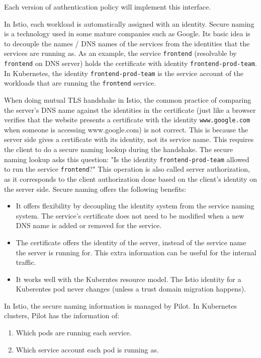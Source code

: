 \noindent Each version of authentication policy will implement this interface.

In Istio, each workload is automatically assigned with an identity. Secure naming is a technology used in some mature companies such as Google. Its basic idea is to decouple the names / DNS names of the services from the identities that the services are running as. As an example, the service \texttt{frontend} (resolvable by \texttt{frontend} on DNS server) holds the certificate with identity \texttt{frontend-prod-team}. In Kubernetes, the identity \texttt{frontend-prod-team} is the service account of the workloads that are running the \texttt{frontend} service.

When doing mutual TLS handshake in Istio, the common practice of comparing the server's DNS name against the identities in the certificate (just like a browser verifies that the website presents a certificate with the identity \texttt{www.google.com} when someone is accessing www.google.com) is not correct. This is because the server side gives a certificate with its identity, not its service name. This requires the client to do a secure naming lookup during the handshake. The secure naming lookup asks this question: "Is the identity \texttt{frontend-prod-team} allowed to run the service \texttt{frontend}?" This operation is also called server authorization, as it corresponds to the client authorization done based on the client’s identity on the server side.
Secure naming offers the following benefits:

    \begin{itemize}
    \item It offers flexibility by decoupling the identity system from the service naming system. The service’s certificate does not need to be modified when a new DNS name is added or removed for the service.
    \item The certificate offers the identity of the server, instead of the service name the server is running for. This extra information can be useful for the internal traffic.
    \item It works well with the Kuberntes resource model. The Istio identity for a Kuberentes pod never changes (unless a trust domain migration happens).
    \end{itemize}

In Istio, the secure naming information is managed by Pilot. In Kubernetes clusters, Pilot has the information of: 

\begin{enumerate}
    \item Which pods are running each service.
    \item Which service account each pod is running as. 
\end{enumerate}


